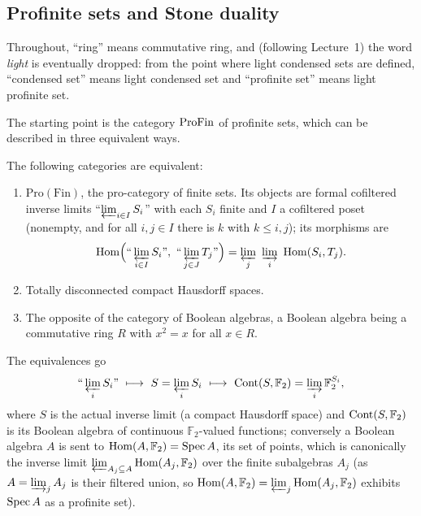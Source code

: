 \subsection{Profinite sets and Stone duality}

\begin{notation}
\label{not:2:light-drop}
Throughout, ``ring'' means commutative ring, and (following Lecture~1) the word
\emph{light} is eventually dropped: from the point where light condensed sets are
defined, ``condensed set'' means light condensed set and ``profinite set'' means
light profinite set.
\end{notation}

The starting point is the category $\mathrm{ProFin}$ of profinite sets, which can be
described in three equivalent ways.

\begin{proposition}
\label{prop:2:stone-duality}
The following categories are equivalent:
\begin{enumerate}
\item $\mathrm{Pro}(\mathrm{Fin})$, the pro-category of finite sets. Its objects
are formal cofiltered inverse limits ``$\varprojlim_{i\in I} S_i$'' with each
$S_i$ finite and $I$ a cofiltered poset (nonempty, and for all $i,j\in I$ there is
$k$ with $k\le i,j$); its morphisms are
\begin{equation*}
\operatorname{Hom}\Bigl(\text{``}\varprojlim_{i\in I} S_i\text{''},\
\text{``}\varprojlim_{j\in J} T_j\text{''}\Bigr)
=\varprojlim_{j}\ \varinjlim_{i}\ \operatorname{Hom}(S_i,T_j).
\end{equation*}
\item Totally disconnected compact Hausdorff spaces.
\item The opposite of the category of Boolean algebras, a Boolean algebra being a
commutative ring $R$ with $x^2=x$ for all $x\in R$.
\end{enumerate}
The equivalences go
\[
\text{``}\varprojlim_i S_i\text{''}\ \longmapsto\
S=\varprojlim_i S_i\ \longmapsto\
\operatorname{Cont}(S,\mathbb{F}_2)=\varinjlim_i \mathbb{F}_2^{S_i},
\]
where $S$ is the actual inverse limit (a compact Hausdorff space) and
$\operatorname{Cont}(S,\mathbb{F}_2)$ is its Boolean algebra of continuous
$\mathbb{F}_2$-valued functions; conversely a Boolean algebra $A$ is sent to
$\operatorname{Hom}(A,\mathbb{F}_2)=\operatorname{Spec} A$, its set of points, which is canonically the
inverse limit $\varprojlim_{A_j\subseteq A} \operatorname{Hom}(A_j,\mathbb{F}_2)$ over the
finite subalgebras $A_j$ (as $A=\varinjlim_j A_j$ is their filtered union, so
$\operatorname{Hom}(A,\mathbb{F}_2)=\varprojlim_j\operatorname{Hom}(A_j,\mathbb{F}_2)$ exhibits $\operatorname{Spec} A$
as a profinite set).
\end{proposition}


